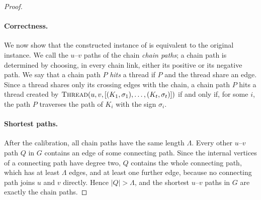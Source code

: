 \begin{proof}
\paragraph{Correctness.}
We now show that the constructed instance of \SSP{} is equivalent to the original \ThreeSAT{} instance.
We call the $u$--$v$ paths of the chain \emph{chain paths}; a chain path is determined by choosing, in every chain link, either its positive or its negative path.
We say that a chain path $P$ \emph{hits} a thread if $P$ and the thread share an edge.
Since a thread shares only its crossing edges with the chain, a chain path $P$ hits a thread created by $\textsc{Thread}(u,v,[(K_1,\sigma_1),\dots,(K_t,\sigma_t)])$ if and only if, for some $i$, the path $P$ traverses the path of $K_i$ with the sign $\sigma_i$.

\paragraph{Shortest paths.}
After the calibration, all chain paths have the same length $\Lambda$.
Every other $u$--$v$ path $Q$ in $G$ contains an edge of some connecting path.
Since the internal vertices of a connecting path have degree two, $Q$ contains the whole connecting path, which has at least $\Lambda$ edges, and at least one further edge, because no connecting path joins $u$ and $v$ directly.
Hence $|Q| > \Lambda$, and the shortest $u$--$v$ paths in $G$ are exactly the chain paths.


\end{proof}
